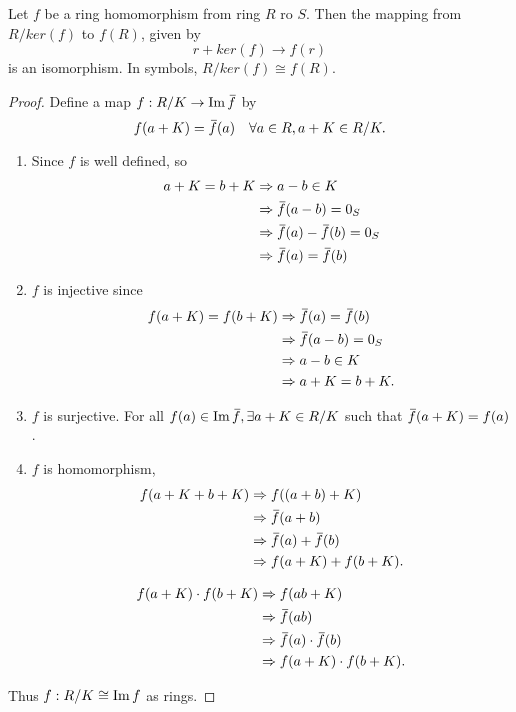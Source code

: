 \begin{theorem}
    Let $f$ be a ring homomorphism from ring $R$ ro $S$. Then the mapping from $R / ker(f)$ to $f(R)$, given by 
    \[
        r + ker(f) \to f(r)
    \]
    is an isomorphism. In symbols, $R/ker(f) \cong f(R)$.
\end{theorem}
\begin{proof}
    Define a map $f: R/K \to \operatorname{Im} \,\overline{\!{f}}$ by 
    \[
        f(a + K) = \,\overline{\!{f}}(a)\quad \forall a \in R, a+ K \in R/K.
    \]
    \begin{enumerate}
        \item Since $f$ is well defined, so 
        \begin{align*}
            a + K = b + K &\Rightarrow a - b \in K\\
            &\Rightarrow \,\overline{\!{f}}(a - b) = 0_S\\
            &\Rightarrow \,\overline{\!{f}}(a) - \,\overline{\!{f}}(b) = 0_S\\
            &\Rightarrow \,\overline{\!{f}}(a) = \,\overline{\!{f}}(b)
        \end{align*}

        \item $f$ is injective since 
            \begin{align*}
                f(a +K) = f(b+K) &\Rightarrow \,\overline{\!{f}}(a) = \,\overline{\!{f}}(b)\\
                &\Rightarrow \,\overline{\!{f}}(a-b) = 0_S\\
                &\Rightarrow a - b \in K\\
                &\Rightarrow a + K = b + K.
            \end{align*}
        
        \item $f$ is surjective. For all $f(a) \in \operatorname{Im} \,\overline{\!{f}}, \exists a+K \in R/K$
            such that $\,\overline{\!{f}}(a+K) = f(a)$.
        
        \item $f$ is homomorphism, 
            \begin{align*}
                f(a + K + b + K) &\Rightarrow f((a+b) + K)\\
                &\Rightarrow \,\overline{\!{f}}(a+b)\\
                &\Rightarrow \,\overline{\!{f}}(a) + \,\overline{\!{f}}(b)\\
                &\Rightarrow f(a+K) + f(b+K).
            \end{align*}

            \begin{align*}
                f(a + K) \cdot f(b + K) &\Rightarrow f(ab + K)\\
                &\Rightarrow \,\overline{\!{f}}(ab)\\
                &\Rightarrow \,\overline{\!{f}}(a) \cdot \,\overline{\!{f}}(b)\\
                &\Rightarrow f(a+K) \cdot f(b+K).
            \end{align*}
    \end{enumerate}
    Thus $f: R/K \cong \operatorname{Im} f$ as rings.
\end{proof}

